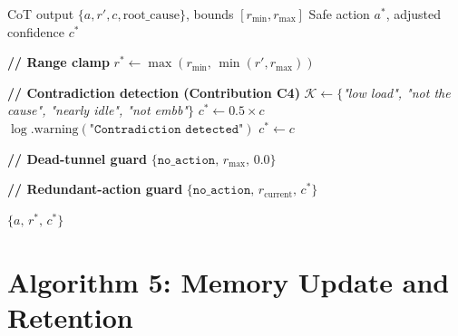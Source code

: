 \begin{algorithm}[H]
\caption{Validation Gate: Safety and Contradiction Detection}
\label{alg:validate}
\begin{algorithmic}[1]
\Require CoT output $\{a, r', c, \text{root\_cause}\}$, bounds $[r_{\min}, r_{\max}]$
\Ensure Safe action $a^*$, adjusted confidence $c^*$

\State \textbf{// Range clamp}
\State $r^* \gets \max(r_{\min},\, \min(r', r_{\max}))$

\State \textbf{// Contradiction detection (Contribution C4)}
\State $\mathcal{K} \gets \{$\textit{"low load", "not the cause", "nearly idle", "not embb"}$\}$
  \State $c^* \gets 0.5 \times c$ 
  \State $\log.\text{warning}(\texttt{"Contradiction detected"})$
\Else
  \State $c^* \gets c$
\EndIf

\State \textbf{// Dead-tunnel guard}
 
  \Return $\{\texttt{no\_action},\, r_{\max},\, 0.0\}$ 
\EndIf

\State \textbf{// Redundant-action guard}
  \Return $\{\texttt{no\_action},\, r_{\text{current}},\, c^*\}$
\EndIf

\Return $\{a,\, r^*,\, c^*\}$
\end{algorithmic}
\end{algorithm}

\section{Algorithm 5: Memory Update and Retention}

